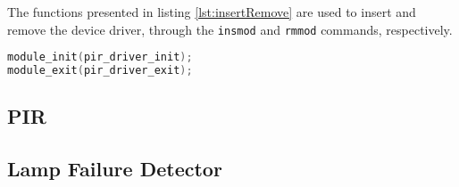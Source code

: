 The functions presented in listing \ref{lst:insertRemove} are used to insert and remove the device driver, through the \verb|insmod| and \verb|rmmod| commands, respectively.

\begin{lstlisting}[language=C, caption={Device Driver insert and remove functions.}, label={lst:insertRemove}]
module_init(pir_driver_init);
module_exit(pir_driver_exit);
\end{lstlisting}


\subsection{PIR}

\subsection{Lamp Failure Detector}